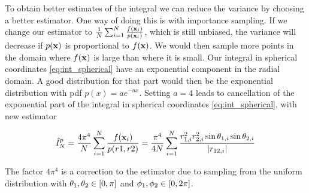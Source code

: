 To obtain better estimates of the integral we can reduce the variance by
choosing a better estimator.
One way of doing this is with importance sampling. If we change our estimator to
$\frac{1}{N} \sum_{i=1}^{N} \frac{f(\mathbf{x}_i)}{p(\mathbf{x}_i)}$, which is still unbiased, the
variance will decrease if $p(\mathbf{x})$ is proportional to $f(\mathbf{x})$. We would then sample
more points in the domain where $f(\mathbf{x})$ is large than where it is small.
Our integral in spherical coordinates \cref{eq:int_spherical} have an exponential
component in the radial domain. A good distribution for that part would then be
the exponential distribution with pdf $p(x) = ae^{-ax}$.
Setting $a = 4$ leads to cancellation of the exponential part of the integral in
spherical coordinates \cref{eq:int_spherical}, with new estimator

\begin{equation}
  \label{eq:estimator_importance}
  \hat{I}_N^p
  = \frac{4\pi^4}{N} \sum_{i=1}^{N} \frac{f(\mathbf{x}_i)}{p(r1,r2)}
  = \frac{\pi^4}{4N} \sum_{i=1}^{N}
  \frac{r_{1,i}^2 r_{2,i}^2 \sin{\theta_{1,i}} \sin{\theta_{2,i}}}{\abs{r_{12,i}}}
\end{equation}

The factor $4\pi^4$ is a correction to the estimator due to sampling from the
uniform distribution with $\theta_1, \theta_2 \in \left[0, \pi\right]$ and
$\phi_1, \phi_2 \in \left[0, 2\pi\right]$.
